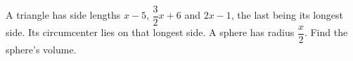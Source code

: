 A triangle has side lengths $x-5$, $\dfrac{3}{2}x+6$ and $2x-1$, the last being its longest side. Its circumcenter lies on that longest side. A sphere has radius $\dfrac{x}{2}$. Find the sphere's volume.
